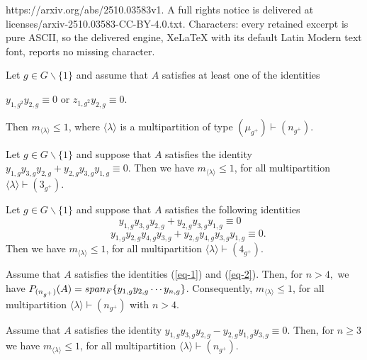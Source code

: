 \documentclass[10pt,a4paper]{amsart}
\newcommand{\spam}{\ensuremath{\textnormal{span}}}
\begin{document}
https://arxiv.org/abs/2510.03583v1. A full rights notice is delivered at licenses/arxiv-2510.03583-CC-BY-4.0.txt. Characters: every retained excerpt is pure ASCII, so the delivered engine, XeLaTeX with its default Latin Modern text font, reports no missing character.
\begin{lema}\label{lema1F} 
 Let $g\in G\backslash \{1\}$ and assume that $A$ satisfies at least one of the identities
	\begin{center}
		$y_{1,g^2}y_{2,g}\equiv 0$ \;  or \;$z_{1,g^2}y_{2,g}\equiv 0.$
	\end{center}
	Then $m_{\langle \lambda \rangle}\le 1$, where $\langle \lambda \rangle$ is a multipartition of type $(\mu_{g^+})\vdash (n_{g^+})$.

\end{lema} 

\begin{lema}\label{lemmanovo} Let $g\in G\backslash \{1\}$ and suppose that $A$ satisfies the identity $y_{1,g}y_{3,g}y_{2,g}+y_{2,g}y_{3,g}y_{1,g}\equiv 0$. Then we have $m_{\langle \lambda \rangle}\le 1$, for all multipartition $\langle \lambda \rangle \vdash (3_{g^+})$.  
		\end{lema} 

\begin{lema}\label{ref0.1} Let $g\in G\backslash \{1\}$ and suppose that $A$ satisfies the following identities 
\begin{equation}\label{eq-1}
    y_{1,g}y_{3,g}y_{2,g}+y_{2,g}y_{3,g}y_{1,g}\equiv 0\;\;\;
\end{equation}
\begin{equation}\label{eq-2}
\;\;\;y_{1,g}y_{2,g}y_{4,g}y_{3,g}+ y_{2,g}y_{4,g}y_{3,g} y_{1,g} \equiv 0
.\end{equation} 
Then we have $m_{\langle \lambda \rangle}\le 1$, for all multipartition $\langle \lambda \rangle \vdash (4_{g^+})$.

     
		\end{lema}

 \begin{lema}\label{ref0.2} 
Assume that $A$ satisfies the identities (\ref{eq-1}) and (\ref{eq-2}). Then, for $n>4,$ we have 
  	$P_{(n_{g^+})}(A)= \spam_F\{y_{1,g}y_{2,g}\cdots y_{n,g}\}$. Consequently, $m_{\langle \lambda \rangle}\le 1$, for all multipartition $\langle \lambda \rangle \vdash (n_{g^+})$ with $n> 4$.
	\end{lema}

 \begin{lema}{\label{ref0.3}} 
Assume that $A$ satisfies the identity $y_{1,g}y_{3,g}y_{2,g}-y_{2,g}y_{1,g}y_{3,g}\equiv 0.$ Then, for $n\ge 3$ we have $m_{\langle \lambda \rangle}\le 1$, for all multipartition $\langle \lambda \rangle \vdash (n_{g^+}).$
	\end{lema} 
\end{document}
